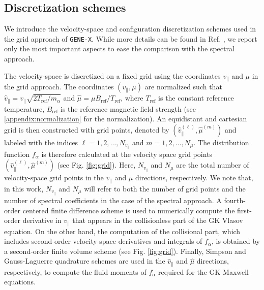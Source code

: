 \documentclass[preprint,12pt]{elsarticle}
\newcommand{\Bref}{B_{\mathrm{ref}}}
\newcommand{\Tref}{T_{\mathrm{ref}}}
\begin{document}
\subsection{Discretization schemes}
\label{subsec:discretization}

We introduce the velocity-space and configuration discretization schemes used in the grid approach of \verb|GENE-X|. While more details can be found in Ref. \cite{michels2021}, we report only the most important aspects to ease the comparison with the spectral approach. 

The velocity-space is discretized on a fixed grid using the coordinates $v_\parallel$ and $\mu$ in the grid approach. The coordinates $(v_\parallel, \mu)$ are normalized such that $\hat v_\parallel = v_\parallel \sqrt{2 \Tref / m_\alpha}$ and $\hat \mu = \mu \Bref / \Tref$, where $\Tref$ is the constant reference temperature, $\Bref$ is the reference magnetic field strength (see \ref{appendix:normalization} for the normalization). An equidistant and cartesian grid is then constructed with grid points, denoted by $(\hat v_\parallel^{(\ell)}, \hat \mu^{(m)})$ and labeled with the indices $\ell = 1, 2, \dots, N_{v_\parallel}$ and $m = 1, 2, \dots, N_\mu$. The distribution function $f_\alpha$ is therefore calculated at the velocity space grid points $(\hat v_\parallel^{(\ell)}, \hat \mu^{(m)})$ (see Fig. \ref{fig:grid}). Here, $N_{v_\parallel}$ and $N_\mu$ are the total number of velocity-space grid points in the $v_\parallel$ and $\mu$ directions, respectively. We note that, in this work, $N_{v_\parallel}$ and $N_\mu$ will refer to both the number of grid points and the number of spectral coefficients in the case of the spectral approach. A fourth-order centered finite difference scheme is used to numerically compute the first-order derivative in $v_\parallel$ that appears in the collisionless part of the GK Vlasov equation. On the other hand, the computation of the collisional part, which includes second-order velocity-space derivatives and integrals of $f_\alpha$, is obtained by a second-order finite volume scheme \cite{ulbl2022} (see Fig. \ref{fig:grid}). Finally, Simpson and Gauss-Laguerre quadrature schemes are used in the $\hat v_\parallel$ and $\hat \mu$ directions, respectively, to compute the fluid moments of $f_\alpha$ required for the GK Maxwell equations.
\end{document}
